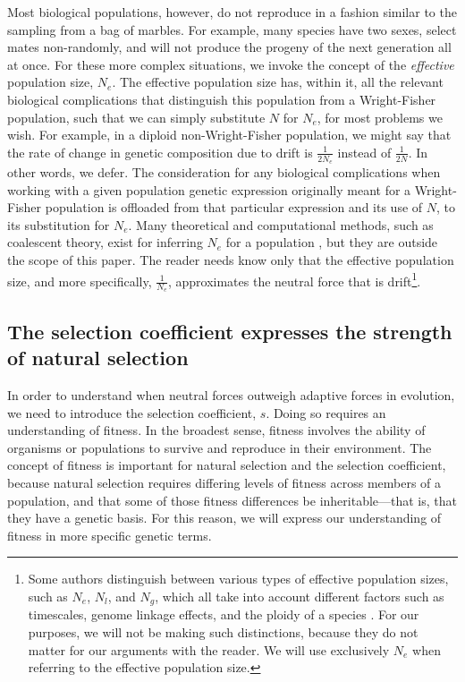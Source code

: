 \documentclass[twocolumn]{article}
\begin{document}
Most biological populations, however, do not reproduce in a fashion similar to the sampling from a bag of marbles. For example, many species have two sexes, select mates non-randomly, and will not produce the progeny of the next generation all at once. For these more complex situations, we invoke the concept of the \textit{effective} population size, $N_e$. The effective population size has, within it, all the relevant biological complications that distinguish this population from a Wright-Fisher population, such that we can simply substitute $N$ for $N_e$, for most problems we wish. For example, in a diploid non-Wright-Fisher population, we might say that the rate of change in genetic composition due to drift is $\frac{1}{2N_e}$ instead of $\frac{1}{2N}$. In other words, we defer. The consideration for any biological complications when working with a given population genetic expression originally meant for a Wright-Fisher population is offloaded from that particular expression and its use of $N$, to its substitution for $N_e$. Many theoretical and computational methods, such as coalescent theory, exist for inferring $N_e$ for a population \cite{charlesworth_2009}, but they are outside the scope of this paper. The reader needs know only that the effective population size, and more specifically, $\frac{1}{N_e}$, approximates the neutral force that is drift\footnote{Some authors distinguish between various types of effective population sizes, such as $N_e$, $N_l$, and $N_g$, which all take into account different factors such as timescales, genome linkage effects, and the ploidy of a species \cite{Lynch_2007, lynch2007origins}. For our purposes, we will not be making such distinctions, because they do not matter for our arguments with the reader. We will use exclusively $N_e$ when referring to the effective population size.}. 

\subsection{The selection coefficient expresses the strength of natural selection}

In order to understand when neutral forces outweigh adaptive forces in evolution, we need to introduce the selection coefficient, $s$. Doing so requires an understanding of fitness. In the broadest sense, fitness involves the ability of organisms or populations to survive and reproduce in their environment\cite{orr_2009}. The concept of fitness is important for natural selection and the selection coefficient, because natural selection requires differing levels of fitness across members of a population, and that some of those fitness differences be inheritable---that is, that they have a genetic basis. For this reason, we will express our understanding of fitness in more specific genetic terms. 
\end{document}
